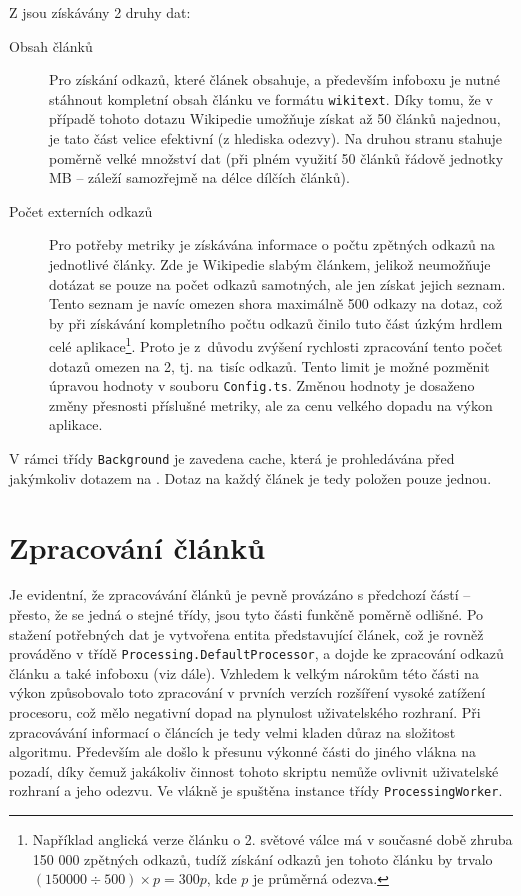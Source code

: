 Z  jsou získávány 2 druhy dat:
\begin{description}
	\item[Obsah článků] Pro získání odkazů, které článek obsahuje, a především infoboxu je nutné stáhnout kompletní obsah článku ve formátu \texttt{wikitext}. Díky tomu, že v případě tohoto dotazu Wikipedie umožňuje získat až 50 článků najednou, je tato část velice efektivní (z hlediska odezvy). Na druhou stranu stahuje poměrně velké množství dat (při plném využití 50 článků řádově jednotky MB -- záleží samozřejmě na délce dílčích článků).
	\item[Počet externích odkazů] Pro potřeby metriky je získávána informace o počtu zpětných odkazů na jednotlivé články. Zde je Wikipedie slabým článkem, jelikož neumožňuje dotázat se pouze na počet odkazů samotných, ale jen získat jejich seznam. Tento seznam je navíc omezen shora maximálně 500 odkazy na dotaz, což by při získávání kompletního počtu odkazů činilo tuto část úzkým hrdlem celé aplikace\footnote{Například anglická verze článku o 2. světové válce má v současné době zhruba 150 000 zpětných odkazů, tudíž získání odkazů jen tohoto článku by trvalo $(150000 \div 500) \times p = 300p$, kde $p$ je průměrná odezva.}. Proto je z~důvodu zvýšení rychlosti zpracování tento počet dotazů omezen na 2, tj. na~tisíc odkazů. Tento limit je možné pozměnit úpravou hodnoty v souboru \texttt{Config.ts}. Změnou hodnoty je dosaženo změny přesnosti příslušné metriky, ale za cenu velkého dopadu na výkon aplikace.
\end{description}

V rámci třídy \texttt{Background} je zavedena cache, která je prohledávána před jakýmkoliv dotazem na . Dotaz na každý článek je tedy položen pouze jednou.

\section{Zpracování článků}
\label{label:processing}
Je evidentní, že zpracovávání článků je pevně provázáno s předchozí částí -- přesto, že se jedná o stejné třídy, jsou tyto části funkčně poměrně odlišné. Po stažení potřebných dat je vytvořena entita představující článek, což je rovněž prováděno v třídě \texttt{Pro\-ce\-ss\-ing.De\-fault\-Pro\-ce\-ssor}, a dojde ke zpracování odkazů článku a také infoboxu (viz dále). Vzhledem k velkým nárokům této části na výkon způsobovalo toto zpracování v prvních verzích rozšíření vysoké zatížení procesoru, což mělo negativní dopad na plynulost uživatelského rozhraní. Při zpracovávání informací o článcích je tedy velmi kladen důraz na složitost algoritmu. Především ale došlo k přesunu výkonné části do jiného vlákna na pozadí, díky čemuž jakákoliv činnost tohoto skriptu nemůže ovlivnit uživatelské rozhraní a jeho odezvu. Ve vlákně je spuštěna instance třídy \texttt{ProcessingWorker}.

